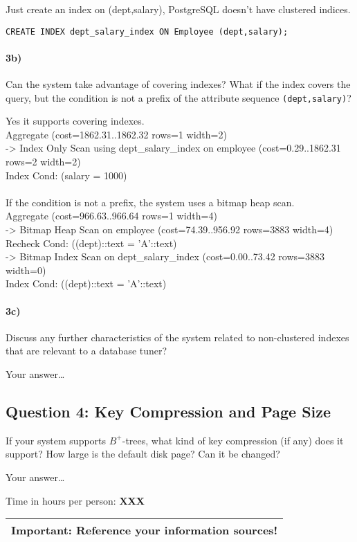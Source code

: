 \documentclass[11pt]{scrartcl}
\begin{document}
\smallskip

Just create an index on (dept,salary), PostgreSQL doesn't have clustered indices.

{\small
\begin{verbatim}
CREATE INDEX dept_salary_index ON Employee (dept,salary);
\end{verbatim}
}

\paragraph{3b)} Can the system take advantage of covering indexes? What if the
index covers the query, but the condition is not a prefix of the
attribute sequence {\tt (dept,salary)}?


\smallskip

Yes it supports covering indexes.\\
Aggregate  (cost=1862.31..1862.32 rows=1 width=2)\\
  ->  Index Only Scan using dept_salary_index on employee  (cost=0.29..1862.31 rows=2 width=2)\\
        Index Cond: (salary = 1000)\\\\
If the condition is not a prefix, the system uses a bitmap heap scan.\\
Aggregate  (cost=966.63..966.64 rows=1 width=4)\\
  ->  Bitmap Heap Scan on employee  (cost=74.39..956.92 rows=3883 width=4)\\
        Recheck Cond: ((dept)::text = 'A'::text)\\
        ->  Bitmap Index Scan on dept_salary_index  (cost=0.00..73.42 rows=3883 width=0)\\
              Index Cond: ((dept)::text = 'A'::text)


\paragraph{3c)} Discuss any further characteristics of the system related to
non-clustered indexes that are relevant to a database tuner?

\smallskip

Your answer\dots

\subsection*{Question 4: Key Compression and Page Size} If your system
supports $B^+$-trees, what kind of key compression (if any) does it
support?  How large is the default disk page? Can it be changed?


\smallskip

Your answer\dots


\bigskip

\noindent Time in hours per person: {\bf XXX}

\bigskip

\begin{center}
  \begin{tabular}{c}
    \hline
    {\bf Important:} Reference your information sources!
    \\\hline
  \end{tabular}
\end{center}
\end{document}
